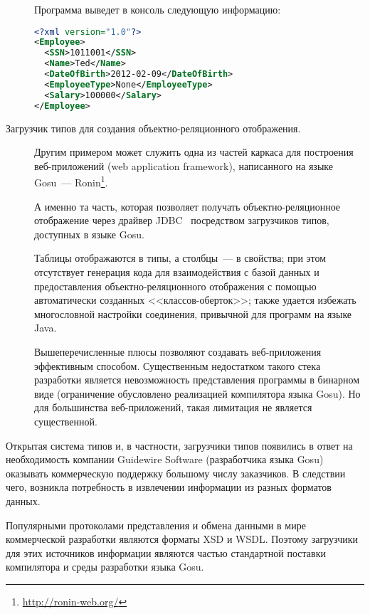 \begin{description}
\begin{code}
Программа выведет в консоль следующую информацию:
\begin{lstlisting}[language=xml, caption={Результат работы программы \ref{gosu-xsd-loader}.}, label=gosu-xsd-loader-result]
<?xml version="1.0"?>
<Employee>
  <SSN>1011001</SSN>
  <Name>Ted</Name>
  <DateOfBirth>2012-02-09</DateOfBirth>
  <EmployeeType>None</EmployeeType>
  <Salary>100000</Salary>
</Employee>
\end{lstlisting}

\end{code}


\item[Загрузчик типов для создания объектно-реляционного отображения.] Другим примером может служить одна из частей каркаса для построения веб-приложений (web application framework), написанного на языке Gosu~--- Ronin\footnote{\url{http://ronin-web.org/}}.

А именно та часть, которая позволяет получать объектно-реляционное отображение через драйвер JDBC~\cite{jdbc-book} посредством загрузчиков типов, доступных в языке Gosu.

Таблицы отображаются в типы, а столбцы~--- в свойства; при этом отсутствует генерация кода для взаимодействия с базой данных и предоставления объектно-реляционного отображения с помощью автоматически созданных <<классов-оберток>>; также удается избежать многословной настройки соединения, привычной для программ на языке Java.

Вышеперечисленные плюсы позволяют создавать веб-приложения эффективным способом. Существенным недостатком такого стека разработки является невозможность представления программы в бинарном виде (ограничение обусловлено реализацией компилятора языка Gosu). Но для большинства веб-приложений, такая лимитация не является существенной.

\end{description}

Открытая система типов и, в частности, загрузчики типов появились в ответ на необходимость компании Guidewire Software (разработчика языка Gosu) оказывать коммерческую поддержку большому числу заказчиков.
В следствии чего, возникла потребность в извлечении информации из разных форматов данных.

Популярными протоколами представления и обмена данными в мире коммерческой разработки являются форматы XSD и WSDL. Поэтому загрузчики для этих источников информации являются частью стандартной поставки компилятора и среды разработки языка Gosu.